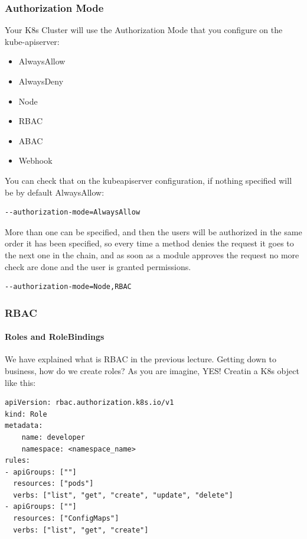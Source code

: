 \documentclass{article}
\newenvironment{codetemplate}[1][]{%
  \mybasecolorbox[#1]
  \itshape
}{%
  \endmybasecolorbox
}
\begin{document}
\subsubsection{Authorization Mode}
Your K8s Cluster will use the Authorization Mode that you configure on the kube-apiserver:
\begin{itemize}
    \item AlwaysAllow
    \item AlwaysDeny
    \item Node
    \item RBAC
    \item ABAC
    \item Webhook
\end{itemize}

You can check that on the kubeapiserver configuration, if nothing specified will be by default AlwaysAllow:
\begin{codetemplate}{}
\begin{verbatim}
--authorization-mode=AlwaysAllow
\end{verbatim}
\end{codetemplate}

More than one can be specified, and then the users will be authorized in the same order it has been specified, so every time a method denies the request it goes to the next one in the chain, and as soon as a module approves the request no more check are done and the user is granted permissions. 
\begin{codetemplate}{}
\begin{verbatim}
--authorization-mode=Node,RBAC
\end{verbatim}
\end{codetemplate}

\subsubsection{RBAC}
\paragraph{Roles and RoleBindings}
We have explained what is RBAC in the previous lecture. Getting down to business, how do we create roles? As you are imagine, YES! Creatin a K8s object like this:

\begin{codetemplate}{}
\begin{verbatim}
apiVersion: rbac.authorization.k8s.io/v1
kind: Role
metadata:
    name: developer
    namespace: <namespace_name>
rules:
- apiGroups: [""]
  resources: ["pods"]
  verbs: ["list", "get", "create", "update", "delete"]
- apiGroups: [""]
  resources: ["ConfigMaps"]
  verbs: ["list", "get", "create"]
\end{verbatim}
\end{codetemplate}
\end{document}
